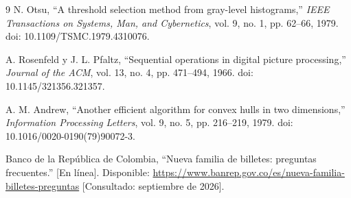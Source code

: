 \documentclass[conference]{IEEEtran}
\begin{document}
\begin{thebibliography}{9}
N. Otsu,
``A threshold selection method from gray-level histograms,''
\textit{IEEE Transactions on Systems, Man, and Cybernetics}, vol. 9,
no. 1, pp. 62--66, 1979. doi: 10.1109/TSMC.1979.4310076.

A. Rosenfeld y J. L. Pfaltz,
``Sequential operations in digital picture processing,''
\textit{Journal of the ACM}, vol. 13, no. 4, pp. 471--494, 1966.
doi: 10.1145/321356.321357.

A. M. Andrew,
``Another efficient algorithm for convex hulls in two dimensions,''
\textit{Information Processing Letters}, vol. 9, no. 5, pp. 216--219,
1979. doi: 10.1016/0020-0190(79)90072-3.

Banco de la República de Colombia,
``Nueva familia de billetes: preguntas frecuentes.'' [En línea].
Disponible: \url{https://www.banrep.gov.co/es/nueva-familia-billetes-preguntas}
[Consultado: septiembre de 2026].

\end{thebibliography}
\end{document}
